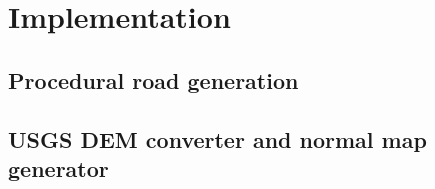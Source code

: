 \chapter{Implementation}

\section{Procedural road generation}


\section{USGS DEM converter and normal map generator}


